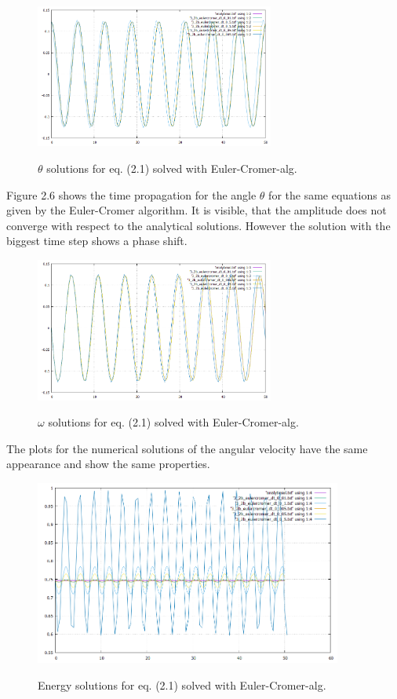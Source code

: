 \documentclass[12pt,a4paper]{article}	%
\begin{document}
\begin{figure}[h!]		
\centering
{\includegraphics[width=0.7\textwidth]{3_2_b_thetaplotsEC.png}}		
\caption{$\theta$ solutions for eq. (2.1) solved with Euler-Cromer-alg.}
\end{figure}
Figure 2.6 shows the time propagation for the angle $\theta$ for the same equations as given by the Euler-Cromer algorithm. It is visible, that the amplitude does not converge with respect to the analytical solutions. However the solution with the biggest time step shows a phase shift. 

\begin{figure}[h!]		
\centering
{\includegraphics[width=0.7\textwidth]{3_2_b_omegaplotsEC.png}}		
\caption{$\omega$ solutions for eq. (2.1) solved with Euler-Cromer-alg.}
\end{figure}

The plots for the numerical solutions of the angular velocity have the same appearance and show the same properties. 

\newpage

\begin{figure}[h!]		
\centering
{\includegraphics[width=0.9\textwidth]{3_2_b_enplotsEC.png}}		
\caption{Energy solutions for eq. (2.1) solved with Euler-Cromer-alg.}
\end{figure}
\end{document}
